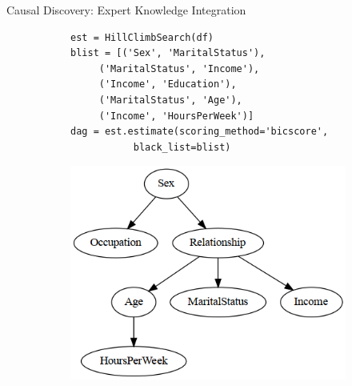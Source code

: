 \documentclass[aspectratio=169]{beamer}
\begin{document}
\begin{frame}[fragile]{Causal Discovery: Expert Knowledge Integration}
	\begin{figure}
		\begin{subfigure}{0.6 \textwidth}
			\begin{verbatim}
est = HillClimbSearch(df)
blist = [('Sex', 'MaritalStatus'),
	 ('MaritalStatus', 'Income'),
	 ('Income', 'Education'),
	 ('MaritalStatus', 'Age'),
	 ('Income', 'HoursPerWeek')]
dag = est.estimate(scoring_method='bicscore',
		   black_list=blist)
			\end{verbatim}
		\end{subfigure}%
		\begin{subfigure}{0.4 \textwidth}
			\centering
			\includegraphics[scale=0.3]{imgs/adult_bic_blacklist.png}
		\end{subfigure}
	\end{figure}
\end{frame}
\end{document}
